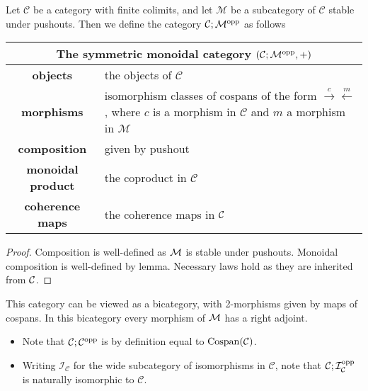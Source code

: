 \begin{proposition}
  Let $\mathcal C$ be a category with finite colimits, and let $\mathcal M$ be a
  subcategory of $\mathcal C$ stable under pushouts. Then we define the category
  $\mathcal C; \mathcal M^{\mathrm{opp}}$ as follows  
  \begin{center}
    \begin{tabular}{| c | p{} |}
      \hline
      \multicolumn{2}{|c|}{The symmetric monoidal category $(\mathcal C;\mathcal M^{\mathrm{opp}},+)$} \\
      \hline
      \textbf{objects} & the objects of $\mathcal C$ \\ 
      \textbf{morphisms} & isomorphism classes of cospans of the form
      $\stackrel{c}\rightarrow \stackrel{m}\leftarrow$, where $c$ is a morphism
      in $\mathcal C$ and $m$ a morphism in $\mathcal M$\\ 
      \textbf{composition} & given by pushout \\
      \textbf{monoidal product} & the coproduct in $\mathcal C$ \\
      \textbf{coherence maps} & the coherence maps in $\mathcal C$ \\
      \hline
    \end{tabular}
  \end{center}
\end{proposition}
\begin{proof}
  Composition is well-defined as $\mathcal M$ is stable under pushouts. Monoidal
  composition is well-defined by lemma. Necessary laws hold as they are
  inherited from $\mathcal C$. 
\end{proof}

This category can be viewed as a bicategory, with 2-morphisms given by maps of
cospans. In this bicategory every morphism of $\mathcal M$ has a right adjoint.

\begin{examples}
  \begin{itemize}
    \item Note that $\mathcal C; \mathcal C^{\mathrm{opp}}$ is by definition equal to
      $\operatorname{{Cospan}}(\mathcal C)$. 

    \item Writing $\mathcal I_{\mathcal C}$ for the wide subcategory of
      isomorphisms in $\mathcal C$, note that $\mathcal C;\mathcal I_{\mathcal
      C}^{\mathrm{opp}}$ is naturally isomorphic to $\mathcal C$.
  \end{itemize}
\end{examples}

